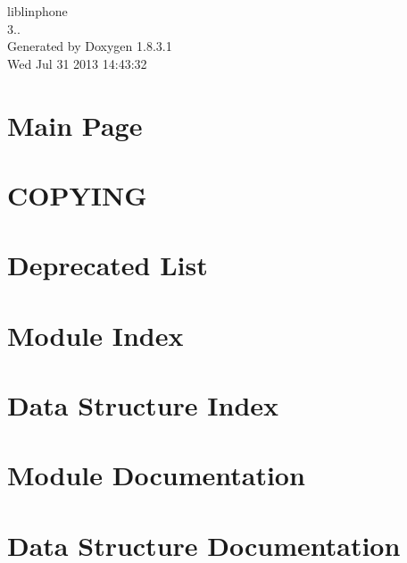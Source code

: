 \documentclass{book}
\begin{document}
\begin{titlepage}
\vspace*{7cm}
\begin{center}
{\Large liblinphone \\[1ex]\large 3.. }\\
\vspace*{1cm}
{\large Generated by Doxygen 1.8.3.1}\\
\vspace*{0.5cm}
{\small Wed Jul 31 2013 14:43:32}\\
\end{center}
\end{titlepage}
\clearemptydoublepage
{}
\tableofcontents
\clearemptydoublepage
{}
\chapter{Main Page}
\label{index}
\chapter{C\-O\-P\-Y\-I\-N\-G}
\label{liblinphone_license}

\chapter{Deprecated List}
\label{deprecated}

\chapter{Module Index}

\chapter{Data Structure Index}

\chapter{Module Documentation}























\chapter{Data Structure Documentation}






\printindex
\end{document}
